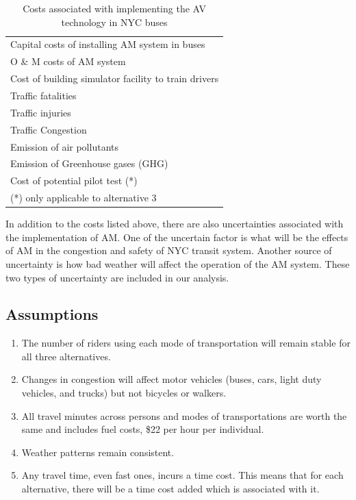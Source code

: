 \documentclass[11pt, letterpaper]{article}
\begin{document}
\begin{table}[h]
\caption{Costs associated with implementing the AV technology in NYC buses}
\begin{center}
\begin{tabular}{l}
\hline\hline
Capital costs of installing AM system in buses\\
O \& M costs of AM system \\
Cost of building simulator facility to train drivers \\
Traffic fatalities \\
Traffic injuries \\
Traffic Congestion \\
Emission of air pollutants \\
Emission of Greenhouse gases (GHG) \\
Cost of potential pilot test (*) \\
\hline\hline
{\footnotesize (*) only applicable to alternative 3}
\end{tabular}
\end{center}
\label{tab:bca.costs}
\end{table}%

In addition to the costs listed above, there are also uncertainties associated 
with the implementation of AM. One of the uncertain factor is what will be the effects
of AM in the congestion and safety of NYC transit system. Another source of 
uncertainty is how bad weather will affect the operation of the AM system. These two
types of uncertainty are included in our analysis.

\subsection{Assumptions}

\begin{enumerate}[leftmargin=*]
\item The number of riders using each mode of transportation will remain
  stable for all three alternatives.
\item Changes in congestion will affect motor vehicles (buses, cars,
  light duty vehicles, and trucks) but not bicycles or walkers.
\item All travel minutes across persons and modes of transportations
  are worth the same and includes fuel costs, \$22 per hour per individual.
\item Weather patterns remain consistent.
\item Any travel time, even fast ones, incurs a time cost.  This means
  that for each alternative, there will be a time cost added which is
  associated with it.
\end{enumerate}
\end{document}
